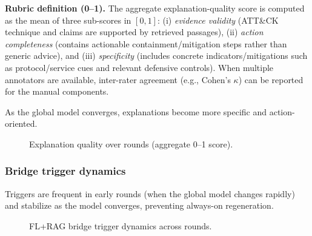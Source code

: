 \documentclass[conference]{IEEEtran}
\begin{document}
\textbf{Rubric definition (0--1).} The aggregate explanation-quality score is computed as the mean of three sub-scores in $[0,1]$: (i) \emph{evidence validity} (ATT\&CK technique and claims are supported by retrieved passages), (ii) \emph{action completeness} (contains actionable containment/mitigation steps rather than generic advice), and (iii) \emph{specificity} (includes concrete indicators/mitigations such as protocol/service cues and relevant defensive controls). When multiple annotators are available, inter-rater agreement (e.g., Cohen’s $\kappa$) can be reported for the manual components.

As the global model converges, explanations become more specific and action-oriented.

\begin{figure}[t]
\centering
{}
\caption{Explanation quality over rounds (aggregate 0--1 score).}
\label{fig:explanation_quality}
\end{figure}

\subsubsection{Bridge trigger dynamics}
Triggers are frequent in early rounds (when the global model changes rapidly) and stabilize as the model converges, preventing always-on regeneration.

\begin{figure}[t]
\centering
{}
\caption{FL+RAG bridge trigger dynamics across rounds.}
\label{fig:trigger_dynamics}
\end{figure}
\end{document}

